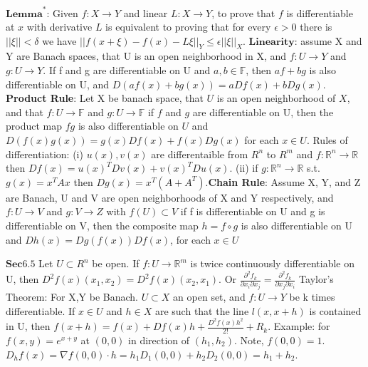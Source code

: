 \documentclass{article}
\theoremstyle{definition}
\begin{document}
{$\textbf{Lemma}^*$: Given $f:X \to Y$ and linear $L: X\to Y$, to prove that $f$ is differentiable at $x$ with derivative $L$ is equivalent to proving that for every $\epsilon >0$ there is $||\xi||<\delta$ we have $||f(x + \xi) - f(x) - L \xi||_Y \leq \epsilon ||\xi||_X$. $\mathbf{Linearity}$: assume X and Y are Banach spaces, that U is an open neighborhood in X, and $f: U \to Y$ and $g: U \to Y$. If f and g are differentiable on U and $a,b \in \mathbb{F}$, then $af +bg$ is also differentiable on U, and $D(af(x) + bg(x)) = aDf(x) +bDg(x)$. \textbf{Product Rule}: Let X be banach space, that $U$ is an open neighborhood of $X$, and that $f:U\to \mathbb{F}$ and $g:U \to \mathbb{F}$ if $f$ and $g$ are differentiable on U, then the product map $fg$ is also differentiable on $U$ and $D(f(x)g(x)) = g(x)Df(x)+ f(x)Dg(x)$ for each $x \in U$. Rules of differentiation: (i) $u(x), v(x)$ are differentaible from $R^n$ to $R^m$ and $f: \mathbb{R}^n \to\mathbb{R}$ then $Df(x) = u(x)^TDv(x) +v(x)^T Du(x)$. (ii) if $g:\mathbb{R}^n \to \mathbb{R}$ s.t. $g(x) = x^TAx$ then $Dg(x) = x^T(A+A^T)$.\textbf{Chain Rule}: Assume X, Y, and Z are Banach, U and V are open neighborhoods of X and Y respectively, and $f: U\to V$ and $g:V\to Z$ with $f(U) \subset V$ if f is differentiable on U and g is differentiable on V, then the composite map $h = f \circ g$ is also differentiable on U and $Dh(x) = Dg(f(x))Df(x)$, for each $x\in U$



 $\mathbf{Sec 6.5}$ 
 Let $U \subset R^n$ be open. If $f: U \to \mathbb{R}^m$ is twice continuously differentiable on U, then $D^2f(x)(x_1,x_2) = D^2f(x)(x_2,x_1)$. Or $\frac{\partial^2 f_k}{\partial x_i \partial x_j} = \frac{\partial^2 f_k}{\partial x_j \partial x_i}$
 Taylor's Theorem: For X,Y be Banach. $U \subset X$ an open set, and $f: U \to Y$ be k times differentiable. If $x \in U$ and $h \in X$ are such that the line $l(x, x+h)$ is contained in U, then $f(x+h) = f(x) + Df(x)h + \frac{D^2f(x)h^2}{2!} + R_k$. Example: for $f(x,y) = e^{x+y}$ at $(0,0)$ in direction of $(h_1,h_2)$. Note, $f(0,0) = 1$. $D_hf(x) = \nabla f(0,0) \cdot h = h_1D_1(0,0) + h_2D_2(0,0) = h_1 + h_2$. 



}
\end{document}
